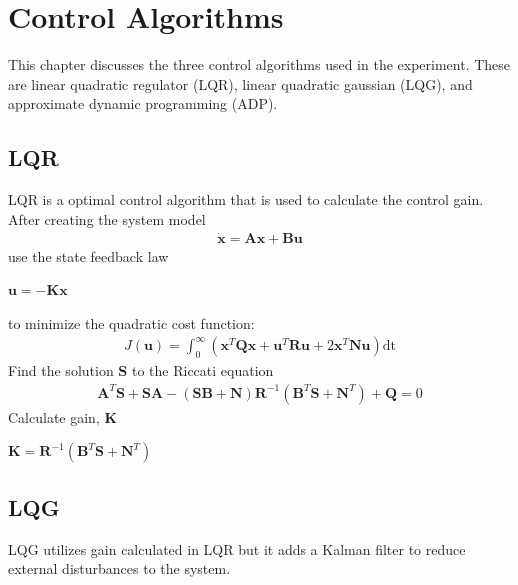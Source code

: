 \chapter{Control Algorithms}
\label{ch: Chapter3}
This chapter discusses the three control algorithms used in the experiment.  These are linear quadratic regulator (LQR), linear quadratic gaussian (LQG), and approximate dynamic programming (ADP).
\section{LQR}
LQR is a optimal control algorithm that is used to calculate the control gain.\\
    After creating the system model
    \begin{align*}
        \dot{\mathbf{x}} = \mathbf{A}\mathbf{x} + \mathbf{B}\mathbf{u}
    \end{align*}
    use the state feedback law
    \begin{center}
        $\mathbf{u} = -\mathbf{K}\mathbf{x}$
    \end{center}
    to minimize the quadratic cost function:
    \begin{align*}
        J(\mathbf{u}) = \int_0^\infty (\mathbf{x}^T\mathbf{Q}\mathbf{x} + \mathbf{u}^T\mathbf{R}\mathbf{u} + 2\mathbf{x}^T\mathbf{N}\mathbf{u})\mathrm{dt}
    \end{align*}
    Find the solution $\mathbf{S}$ to the Riccati equation
    \begin{align*}
        \mathbf{A}^T\mathbf{S}+\mathbf{SA}-(\mathbf{SB}+\mathbf{N})\mathbf{R}^{-1}(\mathbf{B}^T\mathbf{S}+\mathbf{N}^T)+\mathbf{Q}=0
    \end{align*}    
    Calculate gain, $\mathbf{K}$
    \begin{center}
        $\mathbf{K}=\mathbf{R}^{-1}(\mathbf{B}^T\mathbf{S}+\mathbf{N}^T)$
    \end{center}

\section{LQG}
LQG utilizes gain calculated in LQR but it adds a Kalman filter to reduce external disturbances to the system.


